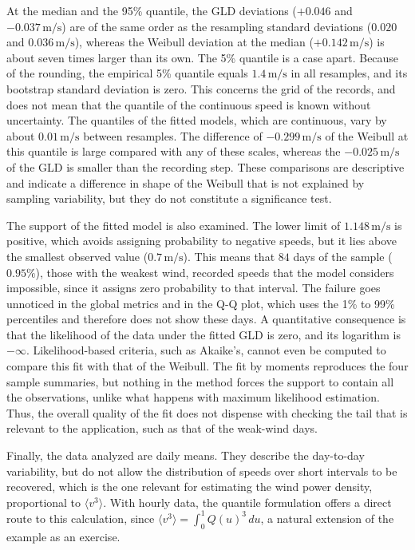 At the median and the 95\% quantile, the GLD deviations ($+0.046$ and $-0.037\,\text{m/s}$) are of the same order as the resampling standard deviations ($0.020$ and $0.036\,\text{m/s}$), whereas the Weibull deviation at the median ($+0.142\,\text{m/s}$) is about seven times larger than its own. The 5\% quantile is a case apart. Because of the rounding, the empirical 5\% quantile equals $1.4\,\text{m/s}$ in all resamples, and its bootstrap standard deviation is zero. This concerns the grid of the records, and does not mean that the quantile of the continuous speed is known without uncertainty. The quantiles of the fitted models, which are continuous, vary by about $0.01\,\text{m/s}$ between resamples. The difference of $-0.299\,\text{m/s}$ of the Weibull at this quantile is large compared with any of these scales, whereas the $-0.025\,\text{m/s}$ of the GLD is smaller than the recording step. These comparisons are descriptive and indicate a difference in shape of the Weibull that is not explained by sampling variability, but they do not constitute a significance test.\par

The support of the fitted model is also examined. The lower limit of $1.148\,\text{m/s}$ is positive, which avoids assigning probability to negative speeds, but it lies above the smallest observed value ($0.7\,\text{m/s}$). This means that $84$ days of the sample ($0.95\%$), those with the weakest wind, recorded speeds that the model considers impossible, since it assigns zero probability to that interval. The failure goes unnoticed in the global metrics and in the Q-Q plot, which uses the 1\% to 99\% percentiles and therefore does not show these days. A quantitative consequence is that the likelihood of the data under the fitted GLD is zero, and its logarithm is $-\infty$. Likelihood-based criteria, such as Akaike's, cannot even be computed to compare this fit with that of the Weibull. The fit by moments reproduces the four sample summaries, but nothing in the method forces the support to contain all the observations, unlike what happens with maximum likelihood estimation. Thus, the overall quality of the fit does not dispense with checking the tail that is relevant to the application, such as that of the weak-wind days.

Finally, the data analyzed are daily means. They describe the day-to-day variability, but do not allow the distribution of speeds over short intervals to be recovered, which is the one relevant for estimating the wind power density, proportional to $\langle v^3 \rangle$. With hourly data, the quantile formulation offers a direct route to this calculation, since $\langle v^3 \rangle = \int_0^1 Q(u)^3\,du$, a natural extension of the example as an exercise.
